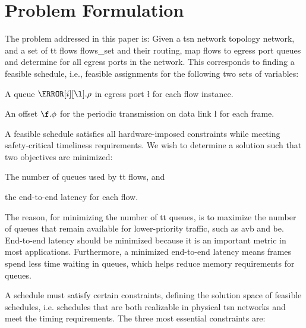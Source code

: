 \section{Problem Formulation} \label{sec:problem_formulation}
The problem addressed in this paper is: Given a \gls{tsn} network topology \gls{network}, and a set of \gls{tt} flows \gls{flows_set} and their routing, map flows to egress port queues and determine  for all egress ports in the network. This corresponds to finding a feasible schedule, i.e., feasible assignments for the following two sets of variables:
\begin{enumerate*}[(i)]
   \item A queue $\s[i][\l].\rho$ in egress port \l{} for each flow instance.
   \item An offset $\f.\phi$ for the periodic transmission on data link \l{} for each frame.
\end{enumerate*}

A feasible schedule satisfies all hardware-imposed constraints while meeting safety-critical timeliness requirements.
We wish to determine a solution such that two objectives are minimized:
\begin{enumerate*}[(i)]
   \item The number of queues used by \gls{tt} flows, and
   \item the end-to-end latency for each flow.
\end{enumerate*}
The reason, for minimizing the number of \gls{tt} queues, is to maximize the number of queues that remain available for lower-priority traffic, such as \gls{avb} and \gls{be}.
End-to-end latency should be minimized because it is an important  metric in most applications.
Furthermore, a minimized end-to-end latency means frames spend less time waiting in queues, which helps reduce memory requirements for queues.

A schedule must satisfy certain constraints, defining the solution space of feasible schedules, i.e. schedules that are both realizable in physical \gls{tsn} networks and meet the timing requirements. The three most essential constraints are:

